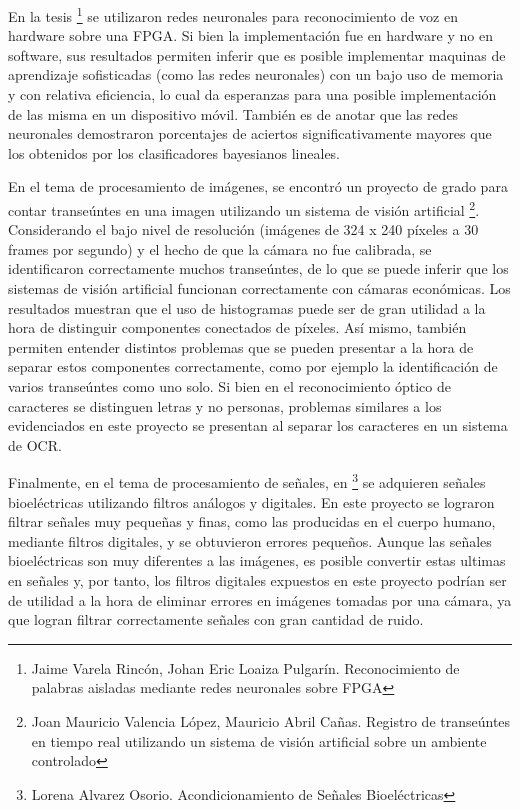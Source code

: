 \documentclass[a4paper, 11pt, oneside]{article}
\begin{document}
    En la tesis \footnote{Jaime Varela Rincón, Johan Eric Loaiza Pulgarín. Reconocimiento de palabras
    aisladas mediante redes neuronales sobre FPGA} se utilizaron redes neuronales para reconocimiento
    de voz en hardware sobre una FPGA. 
    Si bien la implementación fue en hardware y no en software, sus resultados permiten inferir que es 
    posible implementar maquinas de aprendizaje sofisticadas (como las redes neuronales) con un bajo uso
    de memoria y con relativa eficiencia, lo cual da esperanzas para una posible implementación de las 
    misma en un dispositivo móvil. También es de anotar que las redes neuronales demostraron porcentajes 
    de aciertos significativamente mayores que los obtenidos por los clasificadores bayesianos lineales.

	En el tema de procesamiento de imágenes, se encontró un proyecto de grado para contar transeúntes en
    una imagen utilizando un sistema de visión artificial \footnote{Joan Mauricio Valencia López, Mauricio 
    Abril Cañas. Registro de transeúntes en tiempo real utilizando un sistema de visión artificial sobre 
    un ambiente controlado}. Considerando el bajo nivel de resolución (imágenes de 324 x 240 píxeles a 30 
    frames por segundo) y el hecho de que la cámara no fue calibrada, se identificaron correctamente muchos
    transeúntes, de lo que se puede inferir que los sistemas de visión artificial funcionan correctamente 
    con cámaras económicas. Los resultados muestran que el uso de histogramas puede ser de gran utilidad a 
    la hora de distinguir componentes conectados de píxeles. Así mismo, también permiten entender distintos 
    problemas que se pueden presentar a la hora de separar estos componentes correctamente, como por ejemplo
    la identificación de varios transeúntes como uno solo. Si bien en el reconocimiento óptico de caracteres 
    se distinguen letras y no personas, problemas similares a los evidenciados en este proyecto se presentan 
    al separar los caracteres en un sistema de OCR.
	
	Finalmente, en el tema de procesamiento de señales, en \footnote{Lorena Alvarez Osorio. Acondicionamiento 
    de Señales Bioeléctricas} se adquieren señales bioeléctricas utilizando filtros análogos y digitales. 
    En este proyecto se lograron filtrar señales muy pequeñas y finas, como las producidas en el cuerpo humano,
    mediante filtros digitales, y se obtuvieron errores pequeños. Aunque las señales bioeléctricas son muy 
    diferentes a las imágenes, es posible convertir estas ultimas en señales y, por tanto, los filtros digitales 
    expuestos en este proyecto podrían ser de utilidad a la hora de eliminar errores en imágenes tomadas por una
    cámara, ya que logran filtrar correctamente señales con gran cantidad de ruido.\newline
	
\end{document}
